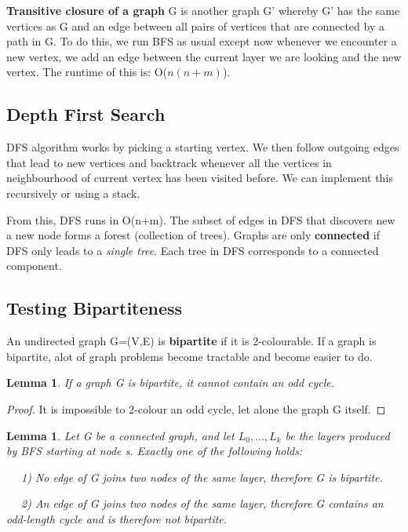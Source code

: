 \documentclass[11pt, oneside]{article}
\newtheorem{lemma}[theorem]{Lemma}
\theoremstyle{definition}
\begin{document}
\textbf{Transitive closure of a graph} G is another graph G' whereby G' has the same vertices as G and an edge between all pairs of vertices that are connected by a path in G. To do this, we run BFS as usual except now whenever we encounter a new vertex, we add an edge between the current layer we are looking and the new vertex. The runtime of this is: O($n(n+m)$).

\subsection{Depth First Search}
DFS algorithm works by picking a starting vertex. We then follow outgoing edges that lead to new vertices and backtrack whenever all the vertices in neighbourhood of current vertex has been visited before. We can implement this recursively or using a stack.

From this, DFS runs in O(n+m). The subset of edges in DFS that discovers new a new node forms a forest (collection of trees). Graphs are only \textbf{connected} if DFS only leads to a \textit{single tree}. Each tree in DFS corresponds to a connected component.

\subsection{Testing Bipartiteness}
An undirected graph G=(V,E) is \textbf{bipartite} if it is 2-colourable. If a graph is bipartite, alot of graph problems become tractable and become easier to do.

\begin{lemma}
  If a graph G is bipartite, it cannot contain an odd cycle.
\end{lemma}
\begin{proof}
  It is impossible to 2-colour an odd cycle, let alone the graph G itself.
\end{proof}
\begin{lemma}
  Let G be a connected graph, and let $L_0,...,L_k$ be the layers produced by BFS starting at node s. Exactly one of the following holds:

  $\quad$ 1) No edge of G joins two nodes of the same layer, therefore G is bipartite.

  $\quad$ 2) An edge of G joins two nodes of the same layer, therefore G contains an odd-length cycle and is therefore not bipartite.
\end{lemma}
\end{document}
